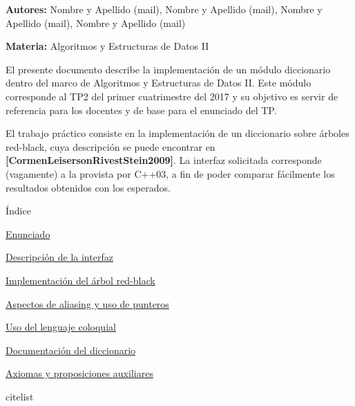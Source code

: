 
\begin{DoxyItemize}
\item {\bfseries \-Autores\-:} \-Nombre y \-Apellido (mail), \-Nombre y \-Apellido (mail), \-Nombre y \-Apellido (mail), \-Nombre y \-Apellido (mail)
\item {\bfseries \-Materia\-:} \-Algoritmos y \-Estructuras de \-Datos \-I\-I
\end{DoxyItemize}

\-El presente documento describe la implementación de un módulo diccionario dentro del marco de \-Algoritmos y \-Estructuras de \-Datos \-I\-I. \-Este módulo corresponde al \-T\-P2 del primer cuatrimestre del 2017 y su objetivo es servir de referencia para los docentes y de base para el enunciado del \-T\-P.

\-El trabajo práctico consiste en la implementación de un diccionario sobre árboles red-\/black, cuya descripción se puede encontrar en {\bfseries [\-Cormen\-Leiserson\-Rivest\-Stein2009]}. \-La interfaz solicitada corresponde (vagamente) a la provista por \-C++03, a fin de poder comparar fácilmente los resultados obtenidos con los esperados.

\begin{DoxyParagraph}{Índice}

\end{DoxyParagraph}

\begin{DoxyItemize}
\item \hyperlink{Enunciado}{\-Enunciado}
\item \hyperlink{Interfaz}{\-Descripción de la interfaz}
\item \hyperlink{Implementacion}{\-Implementación del árbol red-\/black}
\item \hyperlink{Aliasing}{\-Aspectos de aliasing y uso de punteros}
\item \hyperlink{Castellano}{\-Uso del lenguaje coloquial}
\item \hyperlink{classaed2_1_1map}{\-Documentación del diccionario }
\item \hyperlink{axiomas}{\-Axiomas y proposiciones auxiliares}
\item citelist 
\end{DoxyItemize}